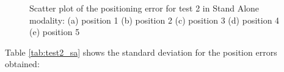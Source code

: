 \begin{figure}[H] 
	\centering
    \newline
    \caption{Scatter plot of the positioning error for test 2 in Stand Alone modality: (a) position 1 (b) position 2 (c) position 3 (d) position 4 (e) position 5}
	\label{FIG:test2_sa_scatter} 
\end{figure}

Table \ref{tab:test2_sa} shows the standard deviation for the position errors obtained:

